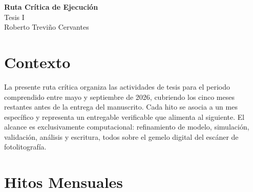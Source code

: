 \documentclass[11pt]{article}
\begin{document}
\setcounter{section}{0}

\thispagestyle{empty}

\begin{center}
{\LARGE \bf Ruta Crítica de Ejecución}\\[4pt]
{\large Tesis I}\\[2pt]
Roberto Treviño Cervantes
\end{center}

\section{Contexto}

La presente ruta crítica organiza las actividades de tesis para el periodo comprendido entre mayo y septiembre de 2026, cubriendo los cinco meses restantes antes de la entrega del manuscrito. Cada hito se asocia a un mes específico y representa un entregable verificable que alimenta al siguiente. El alcance es exclusivamente computacional: refinamiento de modelo, simulación, validación, análisis y escritura, todos sobre el gemelo digital del escáner de fotolitografía.

\section{Hitos Mensuales}
\end{document}
